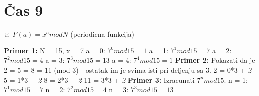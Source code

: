 \documentclass{article}
\begin{document}
\section{Čas 9}
\begin{tcolorbox}[width=\textwidth,colback={beaublue},outer arc=0mm,colupper=charcoal]    
$\sun$ $F(a) = x^a mod N$ (periodicna funkcija) 
\end{tcolorbox}
\textbf{Primer 1:} N = 15, x = 7
\vspace{0.2cm}\newline\hspace*{0.6cm}
a = 0: $7^0 mod 15 = 1$
\newline\hspace*{0.6cm}
a = 1: $7^1 mod 15 = 7$
\newline\hspace*{0.6cm}
a = 2: $7^2 mod 15 = 4$
\newline\hspace*{0.6cm}
a = 3: $7^3 mod 15 = 13$
\newline\hspace*{0.6cm}
a = 4: $7^4 mod 15 = 1$
\vspace{0.4cm}\newline
\textbf{Primer 2:} Pokazati da je 2 = 5 = 8 = 11 (mod 3) - ostatak im je svima isti pri deljenju sa 3.
\vspace{0.2cm}\newline\hspace*{0.4cm}
2 = 0*3 + \textit{2}\newline\hspace*{0.4cm}
5 = 1*3 + \textit{2}\newline\hspace*{0.4cm}
8 = 2*3 + \textit{2}\newline\hspace*{0.4cm}
11 = 3*3 + \textit{2}
\vspace{0.4cm}\newline
\textbf{Primer 3:} Izracunati $7^n mod 15$.
\vspace{0.2cm}\newline\hspace*{0.4cm}
n = 1: $7^1 mod 15 = 7$
\newline\hspace*{0.4cm}
n = 2: $7^2 mod 15 = 4$
\newline\hspace*{0.4cm}
n = 3: $7^3 mod 15 = 13$
\newline\hspace*{0.4cm}
\end{document}
